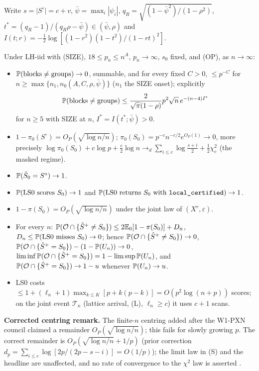 Write $s=|S^\circ|=c+v$, $\bar{\psi}=\max_i|\psi_i|$, $q_R=\sqrt{(1-\bar{\psi}^2)/(1-\rho^2)}$, $t^*=(q_R-1)/(q_R\rho-\bar{\psi})\in(\bar{\psi},\rho)$ and $I(t;r)=-\frac12\log[(1-r^2)(1-t^2)/(1-rt)^2]$.
\begin{theorem}[PXN]\label{thm:PXN}
Under LH-iid with (SIZE), $18\le p_n\le n^A$, $p_n\to\infty$, $s_0$ fixed, and (OP), as $n\to\infty$:
\begin{itemize}
\item[(R)] $\mathbb P(\text{blocks}\ne\text{groups})\to0$, summable, and for every fixed $C>0$, $\le p^{-C}$ for $n\ge\max\{n_1,\allowbreak n_0(A,C,\rho,\bar{\psi})\}$  ($n_1$ the SIZE onset); explicitly \[\mathbb P(\text{blocks}\ne\text{groups})\le\frac{2}{\sqrt\pi(1-\rho)}p^2\sqrt n\,e^{-(n-4)I^*}\] for $n\ge5$ with SIZE at $n$, $I^*=I(t^*;\bar{\psi})>0$.
\item[(S)] $1-\pi_0(S^\circ)=O_P(\sqrt{\log n/n})$; $\pi_0(S_0)=p^{-c}n^{-c/2}e^{O_P(1)}\to0$, more precisely $\log\pi_0(S_0)+c\log p+\frac c2\log n\to_d\sum_{i\le c}\log\frac{s+i}2+\frac12\chi^2_c$ (the masked regime).
\item[(E)] $\mathbb P(\tilde{S}_0=S^\circ)\to1$.
\item[(T)] $\mathbb P(\text{LS0 scores }S_0)\to1$ and $\mathbb P(\text{LS0 returns }S_0\text{ with \texttt{local\_certified}})\to1$.
\item[(P)] $1-\pi(S_0)=O_P(\sqrt{\log n/n})$ under the joint law of $(X^r,\varepsilon)$.
\item[(C)] For every $n$: $\mathbb P(\mathcal O\cap\{\hat S^{+}\ne S_0\})\le2\mathbb E_0[1-\pi(S_0)]+D_n$, $D_n\le\mathbb P(\text{LS0 misses }S_0)\to0$; hence $\mathbb P(\mathcal O\cap\{\hat S^{+}\ne S_0\})\to0$, $\mathbb P(\mathcal O\cap\{\hat S^{+}=S_0\})-(1-\mathbb P(U_n))\to0$, $\liminf\mathbb P(\mathcal O\cap\{\hat S^{+}=S_0\})=1-\limsup\mathbb P(U_n)$, and $\mathbb P(\mathcal O\cap\{\hat S^{+}=S_0\})\to1-u$ whenever $\mathbb P(U_n)\to u$.
\item[(K)] LS0 costs $\le1+(\ell_n+1)\max_{k\le K}[p+k(p-k)]=O(p^2\log(n+p))$ scores; on the joint event $\mathcal T_n$ (lattice arrival, (L), $\ell_n\ge c$) it uses $c+1$ scans.
\end{itemize}
\end{theorem}
\textbf{Corrected centring remark.} The finite-$n$ centring added after the W1-PXN council claimed a remainder $O_P(\sqrt{\log n/n})$; this fails for slowly growing $p$. The correct remainder is $O_P(\sqrt{\log n/n}+1/p)$ (prior correction $d_p=\sum_{i\le c}\log[2p/(2p-s-i)]=O(1/p)$); the limit law in (S) and the headline are unaffected, and no rate of convergence to the $\chi^2$ law is asserted .
